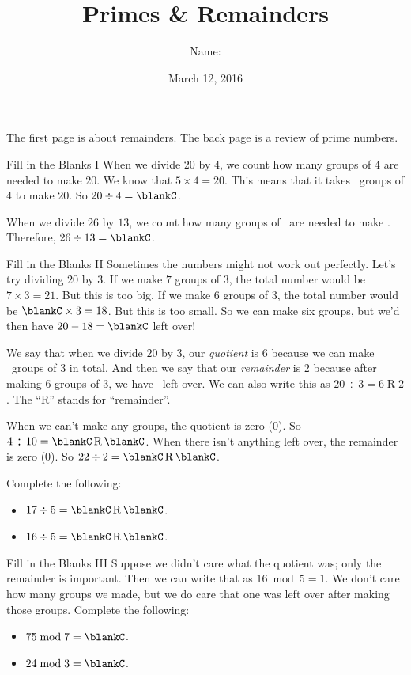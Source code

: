 \documentclass[12pt,letterpaper]{article}
\title{Primes \& Remainders}
\author{Name: \underline{\hspace{5cm}}}
\date{March 12, 2016}
\begin{document}
\maketitle

\thispagestyle{empty}

The first page is about remainders. The back page is a review of prime numbers.

\begin{problem}{Fill in the Blanks I}
 When we divide $20$ by $4$, we count how many groups of $4$ are needed to make
 $20$. We know that $5 \times 4 = 20$. This means that it takes \blankC\ groups of
 $4$ to make $20$. So $20 \div 4 = \blankC$.

 When we divide $26$ by $13$, we count how many groups of \blankC\ are needed to make
 \blankC. Therefore, $26 \div 13 = \blankC$.
\end{problem}

\begin{problem}{Fill in the Blanks II}
 Sometimes the numbers might not work out perfectly. Let's try dividing $20$ by
 $3$. If we make $7$ groups of $3$, the total number would be $7 \times 3 = 21$.
 But this is too big. If we make $6$ groups of $3$, the total number would be
 $\blankC \times 3 = 18$. But this is too small. So we can make six groups, but
 we'd then have $20 - 18 = \blankC$ left over!

 We say that when we divide $20$ by $3$, our \emph{quotient} is $6$ because we
 can make \blankC\ groups of $3$ in total. And then we say that our
 \emph{remainder} is $2$ because after making $6$ groups of $3$, we have \blankC\
 left over. We can also write this as $20 \div 3 = 6 \operatorname{R} 2$. The
 ``R'' stands for ``remainder''.

 When we can't make any groups, the quotient is zero ($0$). So $4 \div 10 = \blankC
 \operatorname{R} \blankC$. When there isn't anything left over, the remainder is zero
 ($0$). So $22 \div 2 = \blankC \operatorname{R} \blankC$.

 Complete the following: \begin{itemize}
  \item $17 \div 5 = \blankC \operatorname{R} \blankC$.
  \item $16 \div 5 = \blankC \operatorname{R} \blankC$.
 \end{itemize}
\end{problem}

\begin{problem}{Fill in the Blanks III}
 Suppose we didn't care what the quotient was; only the remainder is important. Then
 we can write that as $16 \bmod 5 = 1$. We don't care how many groups we made, but we
 do care that one was left over after making those groups. Complete the following:
 \begin{itemize}
  \item $75 \bmod 7 = \blankC$.
  \item $24 \bmod 3 = \blankC$.
 \end{itemize}
\end{problem}
\end{document}
